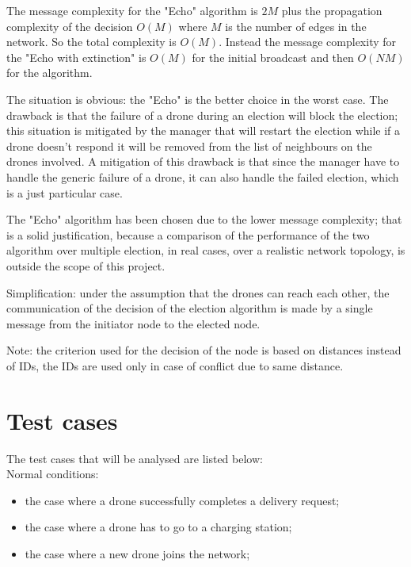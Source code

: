 \documentclass[a4paper, oneside]{memoir}
\begin{document}
The message complexity for the "Echo" algorithm is $2M$ plus the propagation complexity of the decision $O(M)$ where $M$ is the number of edges in the network. So the total complexity is $ O(M) $.
Instead the message complexity for the "Echo with extinction" is $O(M)$ for the initial broadcast and then $O(N M)$ for the algorithm.

The situation is obvious: the "Echo" is the better choice in the worst case.
The drawback is that the failure of a drone during an election will block the election; this situation is mitigated by the manager that will restart the election while if a drone doesn't respond it will be removed from the list of neighbours on the drones involved.
A mitigation of this drawback is that since the manager have to handle the generic failure of a drone, it can also handle the failed election, which is a just particular case.

The "Echo" algorithm has been chosen due to the lower message complexity; that is a solid justification, because a comparison of the performance of the two algorithm over multiple election, in real cases, over a realistic network topology, is outside the scope of this project.

Simplification: under the assumption that the drones can reach each other, the communication of the decision of the election algorithm is made by a single message from the initiator node to the elected node.

Note: the criterion used for the decision of the node is based on distances instead of IDs, the IDs are used only in case of conflict due to same distance.


\section{Test cases}



The test cases that will be analysed are listed below:\\

Normal conditions:
\begin{itemize}
	\item the case where a drone successfully completes a delivery request;
	\item the case where a drone has to go to a charging station;
	\item the case where a new drone joins the network;
\end{itemize}
\end{document}
